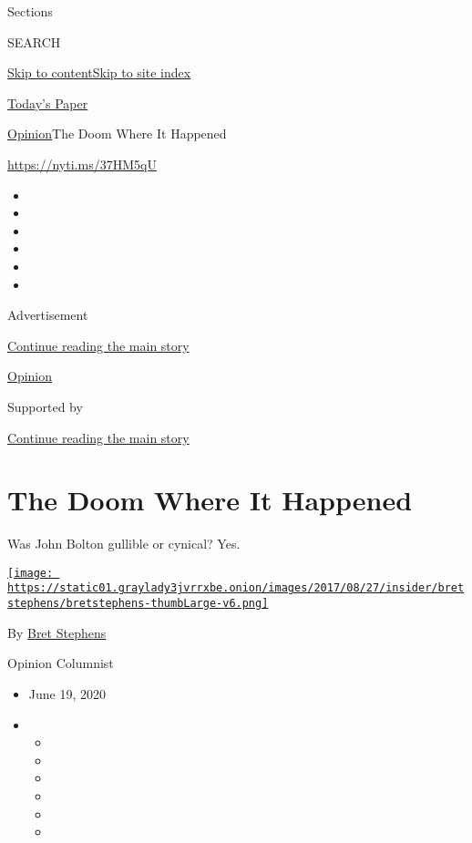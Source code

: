 Sections

SEARCH

\protect\hyperlink{site-content}{Skip to
content}\protect\hyperlink{site-index}{Skip to site index}

\href{https://myaccount.nytimes3xbfgragh.onion/auth/login?response_type=cookie\&client_id=vi}{}

\href{https://www.nytimes3xbfgragh.onion/section/todayspaper}{Today's
Paper}

\href{/section/opinion}{Opinion}\textbar{}The Doom Where It Happened

\url{https://nyti.ms/37HM5qU}

\begin{itemize}
\item
\item
\item
\item
\item
\item
\end{itemize}

Advertisement

\protect\hyperlink{after-top}{Continue reading the main story}

\href{/section/opinion}{Opinion}

Supported by

\protect\hyperlink{after-sponsor}{Continue reading the main story}

\hypertarget{the-doom-where-it-happened}{%
\section{The Doom Where It Happened}\label{the-doom-where-it-happened}}

Was John Bolton gullible or cynical? Yes.

\href{https://www.nytimes3xbfgragh.onion/by/bret-stephens}{\texttt{[image: https://static01.graylady3jvrrxbe.onion/images/2017/08/27/insider/bretstephens/bretstephens-thumbLarge-v6.png]}}

By \href{https://www.nytimes3xbfgragh.onion/by/bret-stephens}{Bret
Stephens}

Opinion Columnist

\begin{itemize}
\item
  June 19, 2020
\item
  \begin{itemize}
  \item
  \item
  \item
  \item
  \item
  \item
  \end{itemize}
\end{itemize}

